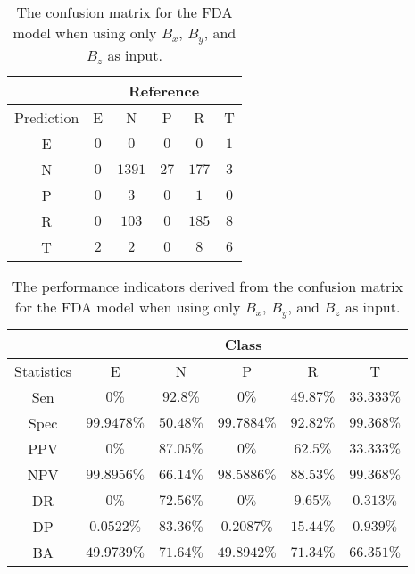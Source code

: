 \begin{table}[!ht]
	\centering
	\begin{tabular}{|c|c|c|c|c|c|}
		\hline
		 & \multicolumn{5}{|c|}{Reference} \\ \hline
		 Prediction & E & N & P & R & T \\ \hline
		 E & $0$ & $0$ & $0$ & $0$ & $1$ \\ \hline
		 N & $0$ & $1391$ & $27$ & $177$ & $3$ \\ \hline
		 P & $0$ & $3$ & $0$ & $1$ & $0$ \\ \hline
		 R & $0$ & $103$ & $0$ & $185$ & $8$ \\ \hline
		 T & $2$ & $2$ & $0$ & $8$ & $6$ \\ \hline
	\end{tabular}
	\caption{The confusion matrix for the FDA model when using only $B_{x}$, $B_{y}$, and $B_{z}$ as input.}
	\label{tab:cm:coord:fda}
\end{table}

\begin{table}[!ht]
	\centering
	\begin{tabular}{|c|c|c|c|c|c|}
		\hline
		 & \multicolumn{5}{c|}{Class} \\ \hline
		Statistics & E & N & P & R & T \\ \hline
		Sen & $0\%$ & $92.8\%$ & $0\%$ & $49.87\%$ & $33.333\%$ \\ \hline
		Spec & $99.9478\%$ & $50.48\%$ & $99.7884\%$ & $92.82\%$ & $99.368\%$ \\ \hline
		PPV & $0\%$ & $87.05\%$ & $0\%$ & $62.5\%$ & $33.333\%$ \\ \hline
		NPV & $99.8956\%$ & $66.14\%$ & $98.5886\%$ & $88.53\%$ & $99.368\%$ \\ \hline
		DR & $0\%$ & $72.56\%$ & $0\%$ & $9.65\%$ & $0.313\%$ \\ \hline
		DP & $0.0522\%$ & $83.36\%$ & $0.2087\%$ & $15.44\%$ & $0.939\%$ \\ \hline
		BA & $49.9739\%$ & $71.64\%$ & $49.8942\%$ & $71.34\%$ & $66.351\%$ \\ \hline
	\end{tabular}
	\caption{The performance indicators derived from the confusion matrix for the FDA model when using only $B_{x}$, $B_{y}$, and $B_{z}$ as input.}
	\label{tab:cs:reverse:coord:fda}
\end{table}

